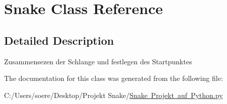 \hypertarget{class_snake_01_projekt_01auf_01_python_1_1_snake}{}\section{Snake Class Reference}
\label{class_snake_01_projekt_01auf_01_python_1_1_snake}


\subsection{Detailed Description}
\begin{DoxyVerb}Zusammensezen der Schlange und festlegen des Startpunktes\end{DoxyVerb}
 

The documentation for this class was generated from the following file\+:\begin{DoxyCompactItemize}
\item 
C\+:/\+Users/soere/\+Desktop/\+Projekt Snake/\mbox{\hyperlink{_snake_01_projekt_01auf_01_python_8py}{Snake Projekt auf Python.\+py}}\end{DoxyCompactItemize}

